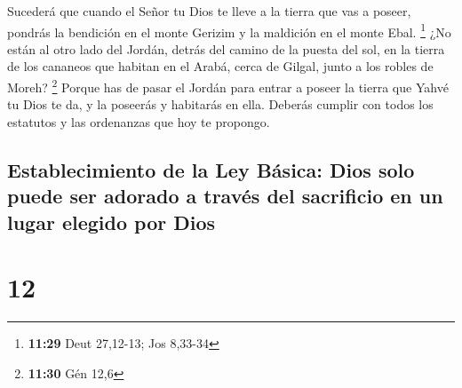 Sucederá que cuando el Señor tu Dios te lleve a la
tierra que vas a poseer, pondrás la bendición en el monte Gerizim y la
maldición en el monte Ebal. \footnote{\textbf{11:29} Deut 27,12-13; Jos
  8,33-34}  ¿No están al otro lado del Jordán, detrás del
camino de la puesta del sol, en la tierra de los cananeos que habitan en
el Arabá, cerca de Gilgal, junto a los robles de Moreh? \footnote{\textbf{11:30}
  Gén 12,6}  Porque has de pasar el Jordán para entrar a
poseer la tierra que Yahvé tu Dios te da, y la poseerás y habitarás en
ella.  Deberás cumplir con todos los estatutos y las
ordenanzas que hoy te propongo.

\hypertarget{establecimiento-de-la-ley-buxe1sica-dios-solo-puede-ser-adorado-a-travuxe9s-del-sacrificio-en-un-lugar-elegido-por-dios}{%
\subsection{Establecimiento de la Ley Básica: Dios solo puede ser
adorado a través del sacrificio en un lugar elegido por
Dios}\label{establecimiento-de-la-ley-buxe1sica-dios-solo-puede-ser-adorado-a-travuxe9s-del-sacrificio-en-un-lugar-elegido-por-dios}}

\hypertarget{section-11}{%
\section{12}\label{section-11}}

